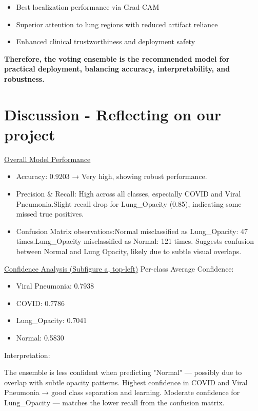 \documentclass{article}
\begin{document}
\begin{itemize}
  \item Best localization performance via Grad-CAM
  \item Superior attention to lung regions with reduced artifact reliance
  \item Enhanced clinical trustworthiness and deployment safety
\end{itemize}

\noindent
\textbf{Therefore, the voting ensemble is the recommended model for practical deployment, balancing accuracy, interpretability, and robustness.}






\section{Discussion - Reflecting on our project}

\underline{ Overall Model Performance }
\begin{itemize}
    \item Accuracy: 0.9203 → Very high, showing robust performance.
    \item Precision \& Recall: High across all classes, especially COVID and Viral Pneumonia.Slight recall drop for Lung\_Opacity (0.85), indicating some missed true positives.
    \item Confusion Matrix observations:Normal misclassified as Lung\_Opacity: 47 times.Lung\_Opacity misclassified as Normal: 121 times. Suggests confusion between Normal and Lung Opacity, likely due to subtle visual overlaps.
\end{itemize}


\underline{Confidence Analysis (Subfigure a, top-left)}
Per-class Average Confidence:
\begin{itemize}
    \item Viral Pneumonia: 0.7938
    \item COVID: 0.7786
    \item Lung\_Opacity: 0.7041
    \item Normal: 0.5830
\end{itemize}

Interpretation:

The ensemble is less confident when predicting "Normal" — possibly due to overlap with subtle opacity patterns.
Highest confidence in COVID and Viral Pneumonia → good class separation and learning.
Moderate confidence for Lung\_Opacity — matches the lower recall from the confusion matrix.
\end{document}
